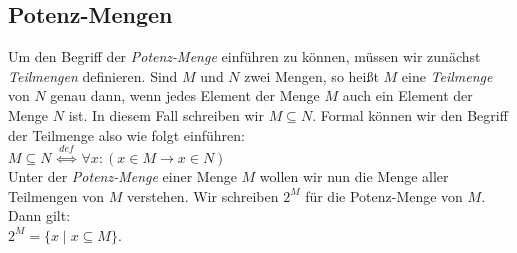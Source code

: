 \subsection{Potenz-Mengen}
Um den Begriff der \emph{Potenz-Menge} einf\"{u}hren zu k\"{o}nnen, m\"{u}ssen wir zun\"{a}chst 
\emph{Teilmengen} definieren.  Sind $M$ und $N$ zwei Mengen, so heißt $M$ eine
\emph{Teilmenge} von $N$ genau dann, wenn jedes Element der Menge $M$ auch ein Element der
Menge $N$ ist.  In diesem Fall schreiben wir $M \subseteq N$.  Formal k\"{o}nnen wir den
Begriff der Teilmenge also wie folgt einf\"{u}hren: \\[0.2cm]
\hspace*{1.3cm} $M \subseteq N \;\stackrel{de\!f}{\Longleftrightarrow}\; \forall x: (x \in M \rightarrow x \in N)$ \\[0.2cm]
Unter der \emph{Potenz-Menge} einer Menge $M$ wollen wir nun die Menge aller Teilmengen
von $M$ verstehen.  Wir schreiben $2^M$ f\"{u}r die Potenz-Menge von $M$.  Dann gilt: \\[0.2cm]
\hspace*{1.3cm} $2^M = \{ x \;|\; x \subseteq M \}$.

